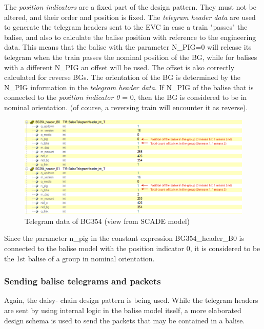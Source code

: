 \documentclass{template/openetcs_article}
\begin{document}
The \emph{position indicators} are a fixed part of the design pattern. They must not be altered, and their order and position is fixed. The \emph{telegram header data} are used to generate the telegram headers sent to the EVC in case a train "passes" the balise, and also to calculate the balise position with reference to the engineering data. This means that the balise with the parameter N\_PIG=0 will release its telegram when the train passes the nominal position of the BG, while for balises with a different N\_PIG an offset will be used. The offset is also correctly calculated for reverse BGs.\newline
The orientation of the BG is determined by the N\_PIG information in the \emph{telegram header data}. If N\_PIG of the balise that is connected to the \emph{position indicator 0} = 0, then the BG is considered to be in nominal orientation. (of course, a reversing train will encounter it as reverse).

\begin{figure}[H]
  \centering
  \includegraphics[width=\textwidth]{images/Telegrams354}
  \caption{Telegram data of BG354 (view from SCADE model)}
  \label{fig:telegrams354SCADE}
\end{figure}

Since the parameter n\_pig in the constant expression BG354\_header\_B0 is connected to the balise model with the position indicator 0, it is considered to be the 1st balise of a group in nominal orientation. 


\subsubsection{Sending balise telegrams and packets}

Again, the daisy- chain design pattern is being used.
While the telegram headers are sent by using internal logic in the balise model itself, a more elaborated design schema is used to send the packets that may be contained in a balise.
\end{document}
